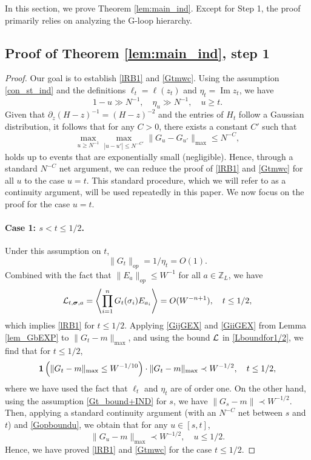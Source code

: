 \documentclass[10pt,reqno]{article}
\DeclareMathOperator{\im}{{\mathrm{Im}}}
\theoremstyle{plain} %
\theoremstyle{remark}
\numberwithin{equation}{section}
\begin{document}
In this section, we prove Theorem \ref{lem:main_ind}. Except for Step 1, the proof primarily relies on analyzing the G-loop hierarchy.

\subsection{Proof of Theorem \ref{lem:main_ind}, step 1}

\begin{proof}

Our goal is to establish \eqref{lRB1} and \eqref{Gtmwc}. Using the assumption \eqref{con_st_ind} and the definitions \(\ell_t = \ell(z_t)\) and \(\eta_t = \im z_t\), we have 
$$
1 - u \gg N^{-1}, \quad \eta_u \gg N^{-1}, \quad u \ge t.
$$
Given that \(\partial_z (H - z)^{-1} = (H - z)^{-2}\) and the entries of \(H_t\) follow a Gaussian distribution, it follows that for any \(C > 0\), there exists a constant \(C'\) such that 
\begin{equation}\label{Gopboundu}
    \max_{u \ge N^{-1}} \max_{|u - u'| \leq N^{-C'}} \| G_u - G_{u'} \|_{\max} \leq N^{-C},
\end{equation}
holds up to events that are exponentially small (negligible). Hence, through a standard \(N^{-C}\) net argument, we can reduce the proof of \eqref{lRB1} and \eqref{Gtmwc} for all \(u\) to the case \(u = t\). This standard procedure, which we will refer to as a continuity argument, will be used repeatedly in this paper. We now focus on the proof for the case \(u = t\).

\paragraph{Case 1: \(s < t \leq 1/2\).} 
Under this assumption on \(t\),  
$$
\|G_t\|_{op} = 1/\eta_t = O(1).
$$
Combined with the fact that \(\|E_a\|_{op} \leq W^{-1}\) for all \(a \in \mathbb{Z}_L\), we have  
\begin{equation}\label{Lboundfor1/2}
    {\cal L}_{t, \boldsymbol{\sigma}, \textbf{a}} = \left\langle \prod_{i=1}^n G_t(\sigma_i) E_{a_i} \right\rangle = O(W^{-n+1}), \quad t \leq 1/2, 
\end{equation}
which implies \eqref{lRB1} for \(t \leq 1/2\). Applying \eqref{GijGEX} and \eqref{GiiGEX} from Lemma \ref{lem_GbEXP} to \(\|G_t - m\|_{\max}\), and using the bound \(\cal L\) in \eqref{Lboundfor1/2}, we find that for \(t \leq 1/2\),
$$
{\bf 1}\left(\|G_t - m\|_{\max} \leq W^{-1/10}\right) \cdot \|G_t - m\|_{\max} \prec W^{-1/2}, \quad t \leq 1/2, 
$$
where we have used the fact that \(\ell_t\) and \(\eta_t\) are of order one. On the other hand, using the assumption \eqref{Gt_bound+IND} for \(s\), we have \(\|G_s - m\| \prec W^{-1/2}\). Then, applying a standard continuity argument (with an \(N^{-C}\) net between \(s\) and \(t\)) and \eqref{Gopboundu}, we obtain that for any \(u \in [s, t]\), 
\begin{equation}\label{Gtmt12}
    \|G_u - m\|_{\max} \prec W^{-1/2}, \quad u \leq 1/2.
\end{equation}
Hence, we have proved \eqref{lRB1} and \eqref{Gtmwc} for the case \(t \leq 1/2\).


\end{proof}
\end{document}
